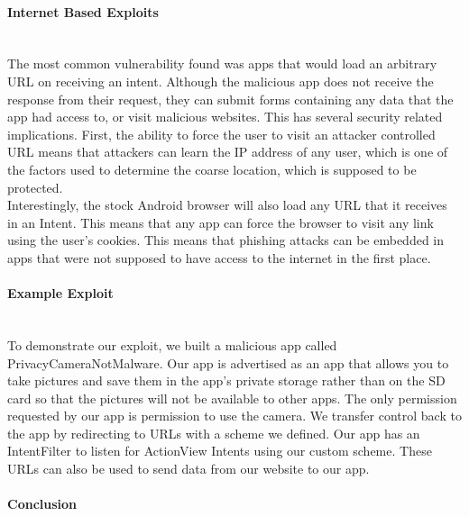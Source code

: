 \documentclass[12pt,a4paper]{article}
\begin{document}
\paragraph{Internet Based Exploits} ~\\
The most common vulnerability found was apps that would load an arbitrary URL on receiving an intent. Although the malicious app does not receive the response from their request, they can submit forms containing any data that the app had access to, or visit malicious websites. This has several security related implications. First, the ability to force the user to visit an attacker controlled URL means that attackers can learn the IP address of any user, which is one of the factors used to determine the coarse location, which is supposed to be protected.  \\
Interestingly, the stock Android browser will also load any URL that it receives in an Intent. This means that any app can force the browser to visit any link using the user's cookies. This means that phishing attacks can be embedded in apps that were not supposed to have access to the internet in the first place. 
\paragraph{Example Exploit} ~\\
To demonstrate our exploit, we built a malicious app called PrivacyCameraNotMalware. Our app is advertised as an app that allows you to take pictures and save them in the app's private storage rather than on the SD card so that the pictures will not be available to other apps. The only permission requested by our app is permission to use the camera. 
We transfer control back to the app by redirecting to URLs with a scheme we defined. Our app has an IntentFilter to listen for ActionView Intents using our custom scheme. These URLs can also be used to send data from our website to our app. 

\paragraph{Conclusion} ~\\

 
\end{document}

